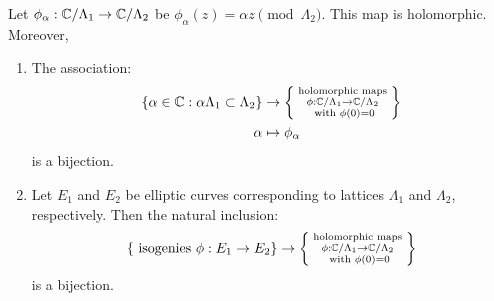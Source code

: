\documentclass[12pt]{article}
\begin{document}
\begin{theorem}
    Let $\phi_\alpha: \mathbb C/\Lambda_1 \to \mathbb C/\Lambda_2$ be $\phi_\alpha(z) = \alpha z \pmod{\Lambda_2}$. This map is holomorphic. Moreover,   
        \begin{enumerate}
        \item The association: 
        \begin{align*}
            \{\alpha \in \mathbb C: \alpha \Lambda_1 \subset \Lambda_2\} &\to \left\{ \substack{ \text{ holomorphic maps } \\ \phi: \mathbb C/\Lambda_1 \to \mathbb C/\Lambda_2 \\
            \text{ with } \phi(0) = 0}\right\} \\
            \alpha &\mapsto \phi_\alpha 
        \end{align*}
        is a bijection. 
        \item Let $E_1$ and $E_2$ be elliptic curves corresponding to lattices $\Lambda_1$ and $\Lambda_2$, respectively. Then the natural inclusion: 
        \[ \{\text{ isogenies } \phi: E_1 \to E_2 \} \to \left\{ \substack{ \text{ holomorphic maps } \\ \phi: \mathbb C/\Lambda_1 \to \mathbb C/\Lambda_2 \\
            \text{ with } \phi(0) = 0}\right\}\]
        is a bijection.
    \end{enumerate}
\end{theorem}
\end{document}

